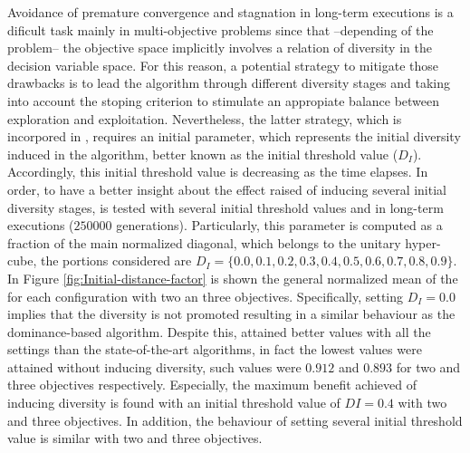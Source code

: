 Avoidance of premature convergence and stagnation in long-term executions is a dificult task mainly in multi-objective problems since that --depending of the problem-- the objective space implicitly involves a relation of diversity in the decision variable space.
%
For this reason, a potential strategy to mitigate those drawbacks is to lead the algorithm through different diversity stages and taking into account the stoping criterion to stimulate an appropiate balance between exploration and exploitation.
%
Nevertheless, the latter strategy, which is incorpored in \VSDMOEA{}, requires an initial parameter, which represents the initial diversity induced in the algorithm, better known as the initial threshold value ($D_I$).
%
Accordingly, this initial threshold value is decreasing as the time elapses.
%
In order, to have a better insight about the effect raised of inducing several initial diversity stages, \VSDMOEA{} is tested with several initial threshold values and in long-term executions ($250000$ generations).
%
Particularly, this parameter is computed as a fraction of the main normalized diagonal, which belongs to the unitary hyper-cube, the portions considered are $D_I = \{0.0, 0.1, 0.2, 0.3, 0.4, 0.5, 0.6, 0.7, 0.8, 0.9\}$.
%
In Figure \ref{fig:Initial-distance-factor} is shown the general normalized mean of the \HV{} for each configuration with two an three objectives.
%
Specifically, setting $D_I=0.0$ implies that the diversity is not promoted resulting in a similar behaviour as the dominance-based algorithm.
%
Despite this, \VSDMOEA{} attained better \HV{} values with all the settings than the state-of-the-art algorithms, in fact the lowest values were attained without inducing diversity, such values were $0.912$ and $0.893$ for two and three objectives respectively.
%
Especially, the maximum benefit achieved of inducing diversity is found with an initial threshold value of $DI=0.4$ with two and three objectives.
%
In addition, the behaviour of setting several initial threshold value is similar with two and three objectives.
%



